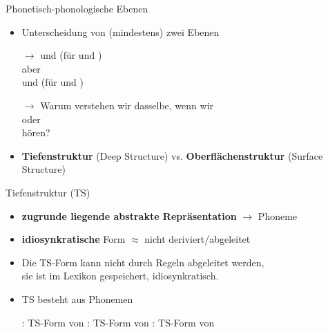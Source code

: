 \begin{frame}{Phonetisch-phonologische Ebenen}

	\begin{itemize}
		\item Unterscheidung von (mindestens) zwei Ebenen
		\item[$\rightarrow$]  und  (für  und )\\
		aber\\
		 und  (für  und )
		\item[]
		\item[$\rightarrow$] Warum verstehen wir dasselbe, wenn wir\\
		\textipa{[ha:k@\alertred{n}]} oder \textipa{[ha:k\alertred{N}]}\\
		hören?
		\item[]
		\item \textbf{Tiefenstruktur} (Deep Structure) vs. \textbf{Oberflächenstruktur} (Surface Structure)
	\end{itemize}
	
\end{frame}




\begin{frame}{Tiefenstruktur (TS)}
	
\begin{itemize}
	\item \textbf{zugrunde liegende abstrakte Repräsentation} $\rightarrow$ Phoneme \textipa{/ /}
	\item[]
	\item \textbf{idiosynkratische} Form $\approx$ nicht deriviert/abgeleitet
	\item Die TS-Form kann nicht durch Regeln abgeleitet werden,\\
                sie ist im Lexikon gespeichert, \dash idiosynkratisch.
	\item[]
	\item TS besteht aus Phonemen
	
	\eal
		\ex {}: TS-Form von 
		\ex {}: TS-Form von 
		\ex {}: TS-Form von 
	\zl
	
\end{itemize}
		
\end{frame}


